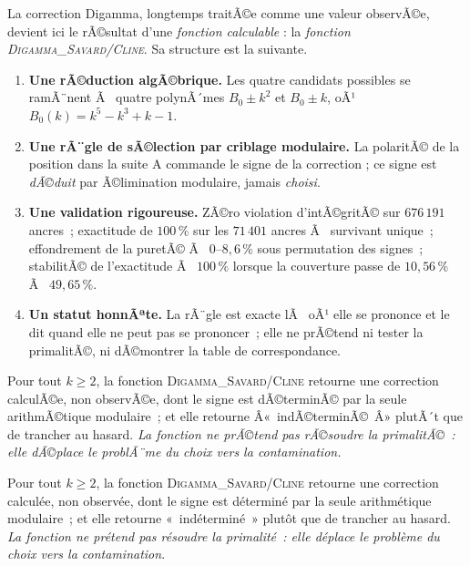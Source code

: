 La correction Digamma, longtemps traitÃ©e comme une valeur observÃ©e,
devient ici le rÃ©sultat d'une \emph{fonction calculable} : la
\emph{fonction \textsc{Digamma\_Savard/Cline}}. Sa structure est la
suivante.

\begin{enumerate}[nosep,leftmargin=*]
  \item \textbf{Une rÃ©duction algÃ©brique.} Les quatre candidats
    possibles se ramÃ¨nent Ã  quatre polynÃ´mes
    $B_0 \pm k^{2}$ et $B_0 \pm k$, oÃ¹
    $B_0(k) = k^{5}-k^{3}+k-1$.
  \item \textbf{Une rÃ¨gle de sÃ©lection par criblage modulaire.} La
    polaritÃ© de la position dans la suite A commande le signe de la
    correction ; ce signe est \emph{dÃ©duit} par Ã©limination
    modulaire, jamais \emph{choisi}.
  \item \textbf{Une validation rigoureuse.} ZÃ©ro violation
    d'intÃ©gritÃ© sur $676\,191$ ancres~; exactitude de $100\,\%$ sur
    les $71\,401$ ancres Ã  survivant unique~; effondrement de la
    puretÃ© Ã  $0$--$8{,}6\,\%$ sous permutation des signes~; stabilitÃ©
    de l'exactitude Ã  $100\,\%$ lorsque la couverture passe de
    $10{,}56\,\%$ Ã  $49{,}65\,\%$.
  \item \textbf{Un statut honnÃªte.} La rÃ¨gle est exacte lÃ  oÃ¹ elle se
    prononce et le dit quand elle ne peut pas se prononcer~; elle ne
    prÃ©tend ni tester la primalitÃ©, ni dÃ©montrer la table de
    correspondance.
\end{enumerate}

\begin{boiteformule}
Pour tout $k \ge 2$, la fonction \textsc{Digamma\_Savard/Cline} retourne
une correction calculÃ©e, non observÃ©e, dont le signe est dÃ©terminÃ© par
la seule arithmÃ©tique modulaire~; et elle retourne Â«~indÃ©terminÃ©~Â»
plutÃ´t que de trancher au hasard. \emph{La fonction ne prÃ©tend pas
rÃ©soudre la primalitÃ©~: elle dÃ©place le problÃ¨me du \emph{choix} vers
la \emph{contamination}.}
\end{boiteformule}
Pour tout $k \ge 2$, la fonction \textsc{Digamma_Savard/Cline} retourne
une correction calculée, non observée, dont le signe est déterminé par
la seule arithmétique modulaire~; et elle retourne «~indéterminé~»
plutôt que de trancher au hasard. \emph{La fonction ne prétend pas
résoudre la primalité~: elle déplace le problème du \emph{choix} vers
la \emph{contamination}}.
